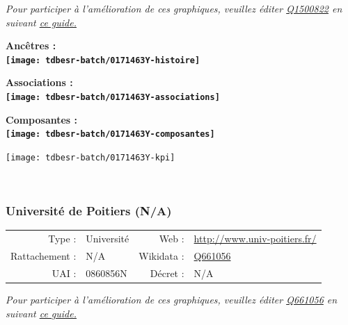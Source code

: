 \documentclass[12pt,french,]{article}
\begin{document}
\textit{\scriptsize Pour participer à l'amélioration de ces graphiques, veuillez éditer  \href{https://www.wikidata.org/entity/Q1500822}{Q1500822}  en suivant \href{https://github.com/cpesr/wikidataESR/blob/master/Rmd/wikidataESR.md}{ce guide.}}

\vspace{1cm}  
\begin{minipage}[b]{0.50\textwidth}\begin{center} \bf Ancêtres : \\  
\texttt{[image: tdbesr-batch/0171463Y-histoire]} \end{center}\end{minipage}\begin{minipage}[b]{0.50\textwidth}\begin{center} \bf Associations : \\  
\texttt{[image: tdbesr-batch/0171463Y-associations]} \end{center}\end{minipage}

\hrulefill

\begin{center} \bf Composantes : \\  
\texttt{[image: tdbesr-batch/0171463Y-composantes]} \end{center}

\begin{center}\texttt{[image: tdbesr-batch/0171463Y-kpi]} \end{center}\checkoddpage

\ifoddpage ~\newpage \fi   

\hypertarget{universituxe9-de-poitiers-na}{%
\subsubsection{Université de Poitiers
(N/A)}\label{universituxe9-de-poitiers-na}}

\begin{tabular*}{\textwidth}{rp{5cm}rl}  
\hline  
Type : & Université & Web : &\href{http://www.univ-poitiers.fr/}{http://www.univ-poitiers.fr/} \\  
Rattachement : & N/A & Wikidata : & \href{https://www.wikidata.org/entity/Q661056}{Q661056} \\  
UAI : & 0860856N & Décret : & N/A \\  
\hline  
\end{tabular*}

\textit{\scriptsize Pour participer à l'amélioration de ces graphiques, veuillez éditer  \href{https://www.wikidata.org/entity/Q661056}{Q661056}  en suivant \href{https://github.com/cpesr/wikidataESR/blob/master/Rmd/wikidataESR.md}{ce guide.}}
\end{document}
